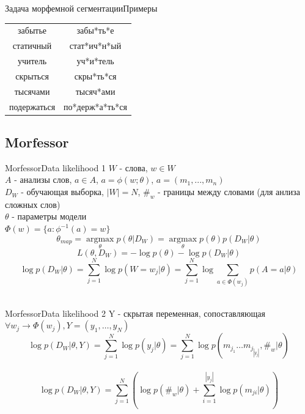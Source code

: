 \documentclass[10pt]{beamer}
\begin{document}
\begin{frame}[fragile]{Задача морфемной сегментации}{Примеры}
\begin{center}
\begin{tabular}{ |c|c| } 
забытье & забы*ть*е \\
статичный & стат*ич*н*ый \\
учитель & уч*и*тель \\
скрыться & скры*ть*ся \\
тысячами & тысяч*ами \\
подержаться & по*держ*а*ть*ся \\
\end{tabular}
\end{center}
\end{frame}

\subsection{Morfessor}
\begin{frame}[fragile]{Morfessor}{Data likelihood 1}
$W$ - слова, $w \in W$ \\
$A$ - анализы слов, $a \in A$, $a = \phi(w; \theta)$, $a = (m_1,..., m_n)$\\
$D_W$ - обучающая выборка, $|W| = N$, $\#_w$ - границы между словами (для анлиза сложных слов)\\
$\theta$ - параметры модели\\
$\Phi(w) = \{a : \phi^{-1}(a) = w\}$\\
$$\theta_{map} = \operatorname*{argmax}_\theta p(\theta| D_W) = \operatorname*{argmax}_\theta p(\theta)p(D_W |\theta)$$
$$L(\theta, D_W) = − \log p(\theta) - \log p(D_W | \theta)$$
$$\log p(D_W | \theta) = \sum_{j=1}^{N} \log p(W = w_j | \theta) = \sum_{j=1}^{N} \log \sum_{a \in \Phi(w_j)} p(A=a| \theta)$$\\
\end{frame}

\begin{frame}[fragile]{Morfessor}{Data likelihood 2}
Y - скрытая переменная, сопоставляющая $\forall w_j \rightarrow \Phi(w_j), Y = (y_1,\dots, y_N)$\\
$$\log p(D_W | \theta, Y) = \sum_{j=1}^{N} \log p(y_j | \theta) =\sum_{j=1}^{N} \log p(m_{j_1} \dots m_{j_|y_j|}, \#_w | \theta)$$\\
$$\log p(D_W | \theta, Y) = \sum_{j=1}^{N} ( \log p(\#_w | \theta) + \sum_{i=1}^{|y_j|} \log p(m_{ji} | \theta))$$
\end{frame}
\end{document}
